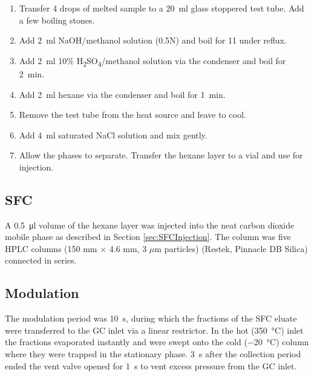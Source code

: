 \begin{enumerate}
  
\item Transfer \num{4} drops of melted sample to a \SI{20}{\milli\litre} glass
stoppered test tube. Add a few boiling stones.

\item Add \SI{2}{\milli\litre} NaOH/methanol solution (0.5N) and boil for
\SI{11}{\min} under reflux.

\item Add \SI{2}{\milli\litre} 10\%
H\textsubscript{2}SO\textsubscript{4}/methanol solution via the condenser and
boil for \SI{2}{\minute}.

\item  Add \SI{2}{\milli\litre} hexane via the condenser and boil for
\SI{1}{\minute}.

\item Remove the test tube from the heat source and leave to cool.

\item Add \SI{4}{\milli\litre} saturated NaCl solution and mix gently.

\item Allow the phases to separate. Transfer the hexane layer to a vial and use
for injection.

\end{enumerate}

\subsection{SFC}

A \SI{0.5}{\micro\litre} volume of the hexane layer was injected into the neat
carbon dioxide mobile phase as described in Section \ref{sec:SFCInjection}. The
column was five HPLC columns (150 mm $\times$ 4.6 mm, 3 $\mu$m particles)
(Restek, Pinnacle DB Silica) connected in series.

\subsection{Modulation}

The modulation period was \SI{10}{\second}, during which the fractions of the SFC
eluate were transferred to the GC inlet via a linear restrictor. In the hot
(\SI{350}{\celsius}) inlet the fractions evaporated instantly and were swept onto the
cold (\SI{-20}{\celsius}) column where they were trapped in the stationary phase.
\SI{3}{\second} after the collection period ended the vent valve opened for
\SI{1}{\second} to vent excess pressure from the GC inlet.

